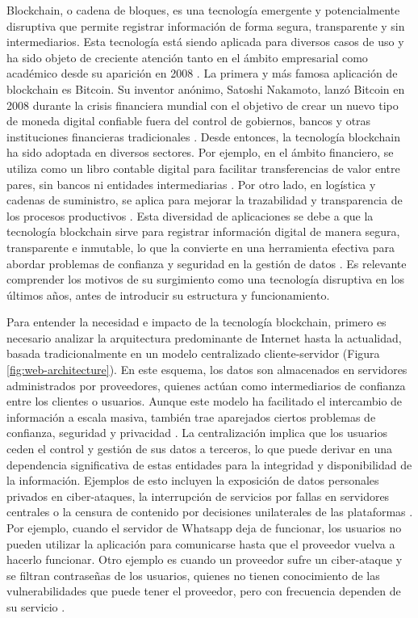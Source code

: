 Blockchain, o cadena de bloques, es una tecnología emergente y potencialmente disruptiva que permite registrar información de forma segura, transparente y sin intermediarios. Esta tecnología está siendo aplicada para diversos casos de uso y ha sido objeto de creciente atención tanto en el ámbito empresarial como académico desde su aparición en 2008 \cite{satoshi2008bitcoin}. La primera y más famosa aplicación de blockchain es Bitcoin. Su inventor anónimo, Satoshi Nakamoto, lanzó Bitcoin en 2008 durante la crisis financiera mundial con el objetivo de crear un nuevo tipo de moneda digital confiable fuera del control de gobiernos, bancos y otras instituciones financieras tradicionales \cite{satoshi2008bitcoin}. Desde entonces, la tecnología blockchain ha sido adoptada en diversos sectores. Por ejemplo, en el ámbito financiero, se utiliza como un libro contable digital para facilitar transferencias de valor entre pares, sin bancos ni entidades intermediarias \cite{bulkowska2023implementation}. Por otro lado, en logística y cadenas de suministro, se aplica para mejorar la trazabilidad y transparencia de los procesos productivos \cite{rejeb2023role}. Esta diversidad de aplicaciones se debe a que la tecnología blockchain sirve para registrar información digital de manera segura, transparente e inmutable, lo que la convierte en una herramienta efectiva para abordar problemas de confianza y seguridad en la gestión de datos \cite{pending}. Es relevante comprender los motivos de su surgimiento como una tecnología disruptiva en los últimos años, antes de introducir su estructura y funcionamiento.

Para entender la necesidad e impacto de la tecnología blockchain, primero es necesario analizar la arquitectura predominante de Internet hasta la actualidad, basada tradicionalmente en un modelo centralizado cliente-servidor (Figura \ref{fig:web-architecture}). En este esquema, los datos son almacenados en servidores administrados por proveedores, quienes actúan como intermediarios de confianza entre los clientes o usuarios. Aunque este modelo ha facilitado el intercambio de información a escala masiva, también trae aparejados ciertos problemas de confianza, seguridad y privacidad \cite{gunawan2024review}. La centralización implica que los usuarios ceden el control y gestión de sus datos a terceros, lo que puede derivar en una dependencia significativa de estas entidades para la integridad y disponibilidad de la información. Ejemplos de esto incluyen la exposición de datos personales privados en ciber-ataques, la interrupción de servicios por fallas en servidores centrales o la censura de contenido por decisiones unilaterales de las plataformas \cite{gunawan2024review}. Por ejemplo, cuando el servidor de Whatsapp deja de funcionar, los usuarios no pueden utilizar la aplicación para comunicarse hasta que el proveedor vuelva a hacerlo funcionar. Otro ejemplo es cuando un proveedor sufre un ciber-ataque y se filtran contraseñas de los usuarios, quienes no tienen conocimiento de las vulnerabilidades que puede tener el proveedor, pero con frecuencia dependen de su servicio \cite{pending}.

